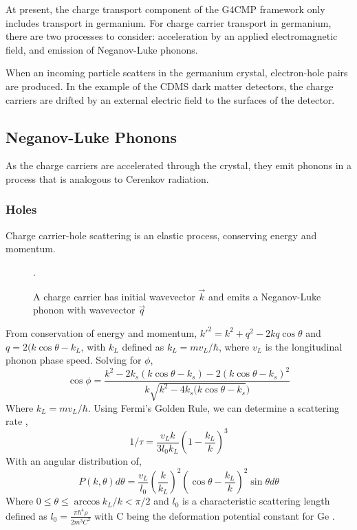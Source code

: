 At present, the charge transport component of the G4CMP framework only includes
transport in germanium. For charge carrier transport in germanium, there are
two processes to consider: acceleration by an applied electromagnetic field,
and emission of Neganov-Luke phonons.

When an incoming particle scatters in the germanium crystal, electron-hole
pairs are produced. In the example of the CDMS dark matter detectors, the
charge carriers are drifted by an external electric field to the surfaces of
the detector. 

\subsection{Neganov-Luke Phonons}
As the charge carriers are accelerated through the crystal, they emit phonons
in a process that is analogous to Cerenkov radiation.
\subsubsection{Holes}
Charge carrier-hole scattering is an elastic process, conserving energy and
momentum.

\begin{figure}[htpb]
    \centering
    \caption{A charge carrier has initial wavevector $\vec{k}$ and emits a
    Neganov-Luke phonon with wavevector $\vec{q}$ \cite{Leman}}.
    \label{fig:scatter}
\end{figure}

From conservation of energy and momentum, $k'^2 = k^2 + q^2 - 2kq\cos{\theta}$
and $q = 2(k\cos{\theta} - k_L$, with $k_L$ defined as $k_L = mv_L/\hbar$,
where $v_L$ is the longitudinal phonon phase speed. Solving for $\phi$,
\begin{equation}
    \cos{\phi} = \frac{k^2 - 2k_s(k\cos{\theta} - k_s) - 2(k\cos{\theta} -
k_s)^2}{k\sqrt{k^2 - 4k_s(k\cos{\theta} - k_s})}
    \label{eq:scatterangle}
\end{equation}
Where $k_L = mv_L/\hbar$. Using Fermi's Golden Rule, we can determine a
scattering rate \cite{Leman},
\begin{equation}
    1/\tau = \frac{v_Lk}{3l_0k_L}\left(1-\frac{k_L}{k}\right)^3
    \label{eq:rate}
\end{equation}
With an angular distribution of,
\begin{equation}
    P(k,\theta) d\theta =
    \frac{v_L}{l_0}\left(\frac{k}{k_L}\right)^2\left(\cos{\theta}-\frac{k_L}{k}\right)^2\sin{\theta}d\theta
    \label{eq:ang-dist}
\end{equation}
Where $0\le\theta\le\arccos{k_L/k}<\pi/2$ and $l_0$ is a characteristic
scattering length defined as $l_0 = \frac{\pi\hbar^4\rho}{2m^3C^2}$ with C
being the deformation potential constant for Ge \cite{Leman}.

